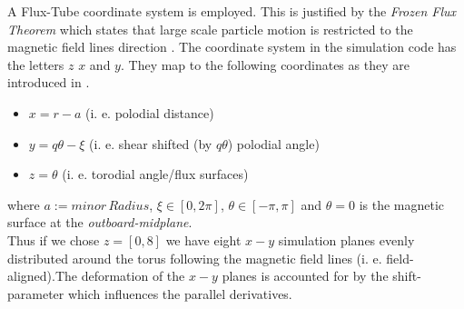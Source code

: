 \documentclass[master.tex]{subfiles}
\begin{document}
A Flux-Tube coordinate system is employed. This is justified by the \textit{Frozen Flux Theorem} which states that large scale particle motion is restricted to the magnetic field lines direction \cite{FrozenFluxTheorem}. 
The coordinate system in the simulation code has the letters $z$ $x$ and $y$. They map to the following coordinates as they are introduced in \cite{doi:10.1063/1.1335832}.
\begin{itemize}
    \item $x = r - a$   (i. e. polodial distance)
    \item $y = q\theta - \xi$ (i. e. shear shifted (by $q\theta$) polodial angle)
    \item $z = \theta$ (i. e. torodial angle/flux surfaces)
\end{itemize} 
where $a:=minor\, Radius$, $\xi \in [0,2\pi]$, $\theta \in [-\pi,\pi]$ and $\theta = 0$ is the magnetic surface at the \textit{outboard-midplane}.\\
Thus if we chose $z=[0,8]$ we have eight $x-y$ simulation planes evenly distributed around the torus following the magnetic field lines (i. e. field-aligned).The deformation of the $x-y$ planes is accounted for by the shift-parameter which influences the parallel derivatives.
\end{document}

